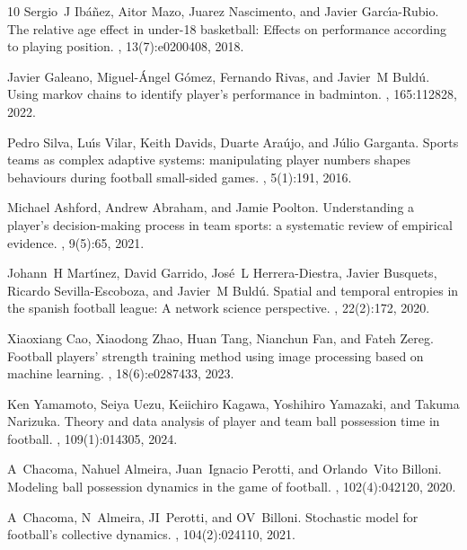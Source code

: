\documentclass[preprint, amsmath,amssymb, pre]{revtex4-2}
\begin{document}
\begin{thebibliography}{10}
Sergio~J Ib{\'a}{\~n}ez, Aitor Mazo, Juarez Nascimento, and Javier
  Garc{\'\i}a-Rubio.
\newblock The relative age effect in under-18 basketball: Effects on
  performance according to playing position.
, 13(7):e0200408, 2018.

Javier Galeano, Miguel-{\'A}ngel G{\'o}mez, Fernando Rivas, and Javier~M
  Buld{\'u}.
\newblock Using markov chains to identify player’s performance in badminton.
, 165:112828, 2022.

Pedro Silva, Lu{\'\i}s Vilar, Keith Davids, Duarte Ara{\'u}jo, and J{\'u}lio
  Garganta.
\newblock Sports teams as complex adaptive systems: manipulating player numbers
  shapes behaviours during football small-sided games.
, 5(1):191, 2016.

Michael Ashford, Andrew Abraham, and Jamie Poolton.
\newblock Understanding a player’s decision-making process in team sports: a
  systematic review of empirical evidence.
, 9(5):65, 2021.

Johann~H Mart{\'\i}nez, David Garrido, Jos{\'e}~L Herrera-Diestra, Javier
  Busquets, Ricardo Sevilla-Escoboza, and Javier~M Buld{\'u}.
\newblock Spatial and temporal entropies in the spanish football league: A
  network science perspective.
, 22(2):172, 2020.

Xiaoxiang Cao, Xiaodong Zhao, Huan Tang, Nianchun Fan, and Fateh Zereg.
\newblock Football players’ strength training method using image processing
  based on machine learning.
, 18(6):e0287433, 2023.

Ken Yamamoto, Seiya Uezu, Keiichiro Kagawa, Yoshihiro Yamazaki, and Takuma
  Narizuka.
\newblock Theory and data analysis of player and team ball possession time in
  football.
, 109(1):014305, 2024.

A~Chacoma, Nahuel Almeira, Juan~Ignacio Perotti, and Orlando~Vito Billoni.
\newblock Modeling ball possession dynamics in the game of football.
, 102(4):042120, 2020.

A~Chacoma, N~Almeira, JI~Perotti, and OV~Billoni.
\newblock Stochastic model for football's collective dynamics.
, 104(2):024110, 2021.


\end{thebibliography}
\end{document}
